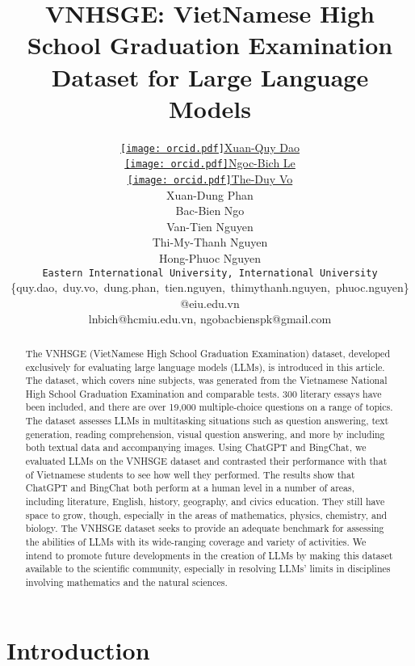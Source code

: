 \documentclass{article}
\title{VNHSGE: VietNamese High School Graduation Examination Dataset for Large Language Models
}
\author{ \href{https://orcid.org/0000-0001-5415-7538}{\texttt{[image: orcid.pdf]}\hspace{1mm}Xuan-Quy Dao} \\
\And
	\href{https://orcid.org/0000-0001-7431-0157}{\texttt{[image: orcid.pdf]}\hspace{1mm}Ngoc-Bich Le}\\
\And
	\href{https://orcid.org/0009-0005-0237-0878}{\texttt{[image: orcid.pdf]}\hspace{1mm}The-Duy Vo}\\
\And
	Xuan-Dung Phan\\
\AND
	Bac-Bien Ngo\\
\And
	Van-Tien Nguyen\\
\And
	Thi-My-Thanh Nguyen\\
\And
	Hong-Phuoc Nguyen\\
\And
	\texttt{Eastern International University,~International University}\\
	\{quy.dao,~duy.vo,~dung.phan,~tien.nguyen,~thimythanh.nguyen,~phuoc.nguyen\}@eiu.edu.vn \\
	lnbich@hcmiu.edu.vn, ngobacbienspk@gmail.com 
}
\begin{document}
	\maketitle


	
	\begin{abstract}
		
		The VNHSGE (VietNamese High School Graduation Examination) dataset, developed exclusively for evaluating large language models (LLMs), is introduced in this article. The dataset, which covers nine subjects, was generated from the Vietnamese National High School Graduation Examination and comparable tests. 300 literary essays have been included, and there are over 19,000 multiple-choice questions on a range of topics. The dataset assesses LLMs in multitasking situations such as question answering, text generation, reading comprehension, visual question answering, and more by including both textual data and accompanying images. Using ChatGPT and BingChat, we evaluated LLMs on the VNHSGE dataset and contrasted their performance with that of Vietnamese students to see how well they performed. The results show that ChatGPT and BingChat both perform at a human level in a number of areas, including literature, English, history, geography, and civics education. They still have space to grow, though, especially in the areas of mathematics, physics, chemistry, and biology. The VNHSGE dataset seeks to provide an adequate benchmark for assessing the abilities of LLMs with its wide-ranging coverage and variety of activities. We intend to promote future developments in the creation of LLMs by making this dataset available to the scientific community, especially in resolving LLMs' limits in disciplines involving mathematics and the natural sciences. 
		
	\end{abstract}
	
		
	\section{Introduction}
	
\end{document}
